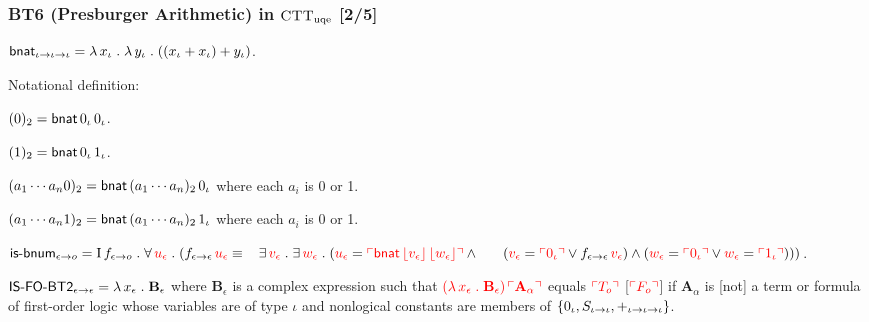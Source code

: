 \documentclass[t,12pt,numbers,fleqn]{beamer}
\newcommand{\churchuqe}{$\mbox{\sc CTT}_{\rm uqe}$}
\newcommand{\syn}[1]{\textcolor{red}{#1}}
\begin{document}
\begin{frame}
\frametitle{BT6 (Presburger Arithmetic) in {\churchuqe} [2/5]}
\small
\bi

  \item[] 

  \be

    \setcounter{enumi}{2}

    \item $\mbox{\sf bnat}_{\iota \rightarrow \iota \rightarrow \iota} =
      \lambda\, x_\iota \mathrel. \lambda\, y_\iota \mathrel. ((x_\iota +
      x_\iota) + y_\iota)$.
      
    Notational definition:

    \bi

      \item[] $(0)_2 = \mbox{\sf bnat} \, 0_\iota \, 0_\iota$.
  
      \item[] $(1)_2 = \mbox{\sf bnat} \, 0_\iota \, 1_\iota$.
  
      \item[] $(a_1 \cdots a_n0)_2 = \mbox{\sf bnat} \, (a_1 \cdots
        a_n)_2 \, 0_\iota$ {\sglsp} where each $a_i$ is 0 or 1.
  
      \item[] $(a_1 \cdots a_n1)_2 = \mbox{\sf bnat} \, (a_1 \cdots
        a_n)_2 \, 1_\iota$ {\sglsp} where each $a_i$ is 0 or 1.
  
    \ei

    \item $\mname{is-bnum}_{\epsilon \tarrow o} = 
      \IotaApp f_{\epsilon \tarrow o} \mdot
      \ForallApp \syn{u_\epsilon} \mdot
      (f_{\epsilon \tarrow \epsilon} \, \syn{u_\epsilon} \Iff {}\newline
      \hspace*{2ex}\ForsomeApp \syn{v_\epsilon} \mdot 
      \ForsomeApp \syn{w_\epsilon} \mdot
      (\syn{u_\epsilon} = \syn{\synbrack{\mname{bnat} \, 
      \commabrack{v_\epsilon} \, \commabrack{w_\epsilon}}} \Andd {}\newline
      \hspace*{4ex}(\syn{v_\epsilon} = \syn{\synbrack{0_\iota}} \Orr
      f_{\epsilon \tarrow \epsilon} \, \syn{v_\epsilon}) \Andd
      (\syn{w_\epsilon} = \syn{\synbrack{0_\iota}} \Orr
      \syn{w_\epsilon} =
      \syn{\synbrack{1_\iota}})))$.

    \item $\mbox{\sf IS-FO-BT2}_{\epsilon \rightarrow \epsilon} = \lambda\,
      x_\epsilon \mathrel. \textbf{B}_\epsilon$ {\sglsp} where
      $\textbf{B}_\epsilon$ is a complex expression such that
      $\syn{(\LambdaApp x_\epsilon \mdot \textbf{B}_\epsilon) \,
        \synbrack{\textbf{A}_\alpha}}$ equals $\syn{\synbrack{T_o}}$
      [$\syn{\synbrack{F_o}}$] if $\textbf{A}_\alpha$ is [not] a term
      or formula of first-order logic whose variables are of type
      $\iota$ and nonlogical constants are members of
      ${\{ 0_\iota,S_{\iota \rightarrow \iota},+_{\iota \rightarrow \iota
          \rightarrow \iota} \}}$.


\end{frame}
\end{document}
